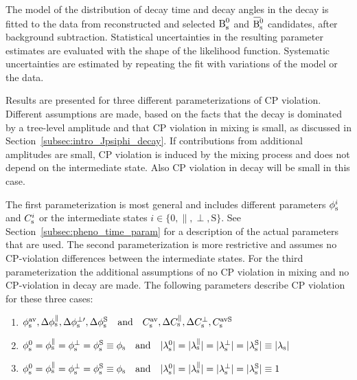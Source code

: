 The model of the distribution of decay time and decay angles in the \BstoJpsiKK{} decay is fitted to the data from reconstructed and
selected $\Bs$ and $\Bsbar$ candidates, after background subtraction. Statistical uncertainties in the resulting parameter estimates are
evaluated with the shape of the likelihood function. Systematic uncertainties are estimated by repeating the fit with variations of the
model or the data.

Results are presented for three different parameterizations of CP violation. Different assumptions are made, based on the facts that the
\BstoJpsiKK{} decay is dominated by a tree-level amplitude and that CP violation in mixing is small, as discussed in
Section~\ref{subsec:intro_Jpsiphi_decay}. If contributions from additional amplitudes are small, CP violation is induced by the \BsBsbar{}
mixing process and does not depend on the intermediate state. Also CP violation in decay will be small in this case.

The first parameterization is most general and includes different parameters $\phisi$ and $\Csi$ or the intermediate states
$i\in\{\text{0}, \parallel, \perp, \text{S}\}$. See Section~\ref{subsec:pheno_time_param} for a description of the actual parameters that
are used. The second parameterization is more restrictive and assumes no CP-violation differences between the intermediate states. For the
third parameterization the additional assumptions of no CP violation in mixing and no CP-violation in decay are made. The following
parameters describe CP violation for these three cases:
\begin{enumerate}
  \item $\phisav,\Delphispara,\Delphisperpp,\DelphisS
         \quad\text{and}\quad\Csav,\DelCspara,\DelCsperp,\CsavS$
  \item $\phisi[\text{0}]=\phisi[\parallel]=\phisi[\perp]=\phisi[\text{S}]\equiv\phis
         \quad\text{and}\quad\lamsiAbs[\text{0}]=\lamsiAbs[\parallel]=\lamsiAbs[\perp]=\lamsiAbs[\text{S}]\equiv\lamsAbs$
  \item $\phisi[\text{0}]=\phisi[\parallel]=\phisi[\perp]=\phisi[\text{S}]\equiv\phis
         \quad\text{and}\quad\lamsiAbs[\text{0}]=\lamsiAbs[\parallel]=\lamsiAbs[\perp]=\lamsiAbs[\text{S}]\equiv1$
\end{enumerate}


